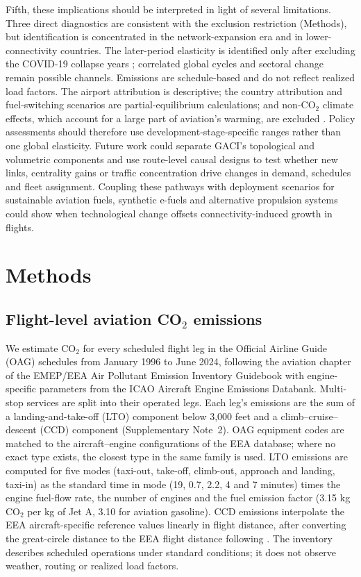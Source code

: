\documentclass[12pt]{extarticle}
\begin{document}
Fifth, these implications should be interpreted in light of several limitations. Three direct diagnostics are consistent with the exclusion restriction (Methods), but identification is concentrated in the network-expansion era and in lower-connectivity countries. The later-period elasticity is identified only after excluding the COVID-19 collapse years \citep{lequere2020}; correlated global cycles and sectoral change remain possible channels. Emissions are schedule-based and do not reflect realized load factors. The airport attribution is descriptive; the country attribution and fuel-switching scenarios are partial-equilibrium calculations; and non-CO$_2$ climate effects, which account for a large part of aviation's warming, are excluded \citep{brazzola2022}. Policy assessments should therefore use development-stage-specific ranges rather than one global elasticity. Future work could separate GACI's topological and volumetric components and use route-level causal designs to test whether new links, centrality gains or traffic concentration drive changes in demand, schedules and fleet assignment. Coupling these pathways with deployment scenarios for sustainable aviation fuels, synthetic e-fuels and alternative propulsion systems could show when technological change offsets connectivity-induced growth in flights.

\section*{Methods}
\subsection*{Flight-level aviation CO$_2$ emissions}

We estimate CO$_2$ for every scheduled flight leg in the Official Airline Guide (OAG) schedules from January 1996 to June 2024, following the aviation chapter of the EMEP/EEA Air Pollutant Emission Inventory Guidebook \citep{eea2023} with engine-specific parameters from the ICAO Aircraft Engine Emissions Databank. Multi-stop services are split into their operated legs. Each leg's emissions are the sum of a landing-and-take-off (LTO) component below 3,000 feet and a climb--cruise--descent (CCD) component (Supplementary Note~2). OAG equipment codes are matched to the aircraft--engine configurations of the EEA database; where no exact type exists, the closest type in the same family is used. LTO emissions are computed for five modes (taxi-out, take-off, climb-out, approach and landing, taxi-in) as the standard time in mode (19, 0.7, 2.2, 4 and 7 minutes) times the engine fuel-flow rate, the number of engines and the fuel emission factor (3.15 kg CO$_2$ per kg of Jet A, 3.10 for aviation gasoline). CCD emissions interpolate the EEA aircraft-specific reference values linearly in flight distance, after converting the great-circle distance to the EEA flight distance following \citet{avogadro2024}. The inventory describes scheduled operations under standard conditions; it does not observe weather, routing or realized load factors.
\end{document}

